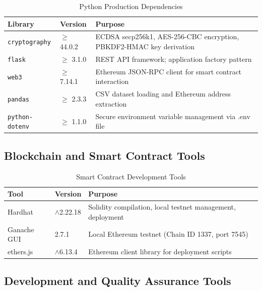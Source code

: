 \documentclass[12pt,a4paper]{report}
\begin{document}
\begin{table}[H]
\centering
\caption{Python Production Dependencies}
\label{tab:pydeps}
\begin{tabular}{|l|l|p{7cm}|}
\hline
\textbf{Library} & \textbf{Version} & \textbf{Purpose} \\
\hline
\texttt{cryptography} & $\geq$ 44.0.2 & ECDSA secp256k1, AES-256-CBC encryption, PBKDF2-HMAC key derivation \\
\hline
\texttt{flask} & $\geq$ 3.1.0 & REST API framework; application factory pattern \\
\hline
\texttt{web3} & $\geq$ 7.14.1 & Ethereum JSON-RPC client for smart contract interaction \\
\hline
\texttt{pandas} & $\geq$ 2.3.3 & CSV dataset loading and Ethereum address extraction \\
\hline
\texttt{python-dotenv} & $\geq$ 1.1.0 & Secure environment variable management via .env file \\
\hline
\end{tabular}
\end{table}

\subsection{Blockchain and Smart Contract Tools}

\begin{table}[H]
\centering
\caption{Smart Contract Development Tools}
\label{tab:contracttools}
\begin{tabular}{|l|l|p{7cm}|}
\hline
\textbf{Tool} & \textbf{Version} & \textbf{Purpose} \\
\hline
Hardhat & $\wedge$2.22.18 & Solidity compilation, local testnet management, deployment \\
\hline
Ganache GUI & 2.7.1 & Local Ethereum testnet (Chain ID 1337, port 7545) \\
\hline
ethers.js & $\wedge$6.13.4 & Ethereum client library for deployment scripts \\
\hline
\end{tabular}
\end{table}

\subsection{Development and Quality Assurance Tools}
\end{document}
